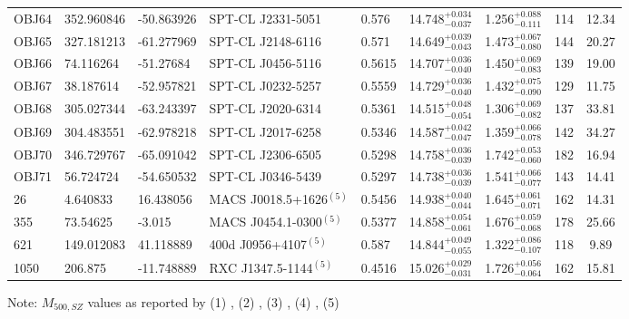 \documentclass[apj,twocolumn]{emulateapj}
\begin{document}
{\begin{table}[h!]
\begin{tabular}{l l l l l c c c c}
 OBJ64 & 352.960846 & -50.863926 &  SPT-CL J2331-5051      & 0.576  & 14.748$^{+0.034}_{-0.037}$ & 1.256$^{+0.088}_{-0.111}$ &   114 & 12.34 \\
 OBJ65 & 327.181213 & -61.277969 &  SPT-CL J2148-6116      & 0.571  & 14.649$^{+0.039}_{-0.043}$ & 1.473$^{+0.067}_{-0.080}$ &   144 & 20.27 \\
 OBJ66 & 74.116264  & -51.27684  &  SPT-CL J0456-5116      & 0.5615 & 14.707$^{+0.036}_{-0.040}$ & 1.450$^{+0.069}_{-0.083}$ &   139 & 19.00 \\
 OBJ67 & 38.187614  & -52.957821 &  SPT-CL J0232-5257      & 0.5559 & 14.729$^{+0.036}_{-0.040}$ & 1.432$^{+0.075}_{-0.090}$ &   129 & 11.75 \\
 OBJ68 & 305.027344 & -63.243397 &  SPT-CL J2020-6314      & 0.5361 & 14.515$^{+0.048}_{-0.054}$ & 1.306$^{+0.069}_{-0.082}$ &   137 & 33.81 \\
 OBJ69 & 304.483551 & -62.978218 &  SPT-CL J2017-6258      & 0.5346 & 14.587$^{+0.042}_{-0.047}$ & 1.359$^{+0.066}_{-0.078}$ &   142 & 34.27 \\
 OBJ70 & 346.729767 & -65.091042 &  SPT-CL J2306-6505      & 0.5298 & 14.758$^{+0.036}_{-0.039}$ & 1.742$^{+0.053}_{-0.060}$ &   182 & 16.94 \\
 OBJ71 & 56.724724  & -54.650532 &  SPT-CL J0346-5439      & 0.5297 & 14.738$^{+0.036}_{-0.039}$ & 1.541$^{+0.066}_{-0.077}$ &   143 & 14.41 \\
 26    & 4.640833   & 16.438056  &  MACS J0018.5+1626$^{(5)}$      & 0.5456 & 14.938$^{+0.040}_{-0.044}$ & 1.645$^{+0.061}_{-0.071}$ &   162 & 14.31 \\
 355   & 73.54625   & -3.015     &  MACS J0454.1-0300$^{(5)}$      & 0.5377 & 14.858$^{+0.054}_{-0.061}$ & 1.676$^{+0.059}_{-0.068}$ &   178 & 25.66 \\
 621   & 149.012083 & 41.118889  &  400d J0956+4107$^{(5)}$        & 0.587  & 14.844$^{+0.049}_{-0.055}$ & 1.322$^{+0.086}_{-0.107}$ &   118 & 9.89  \\
 1050  & 206.875    & -11.748889 &  RXC J1347.5-1144$^{(5)}$       & 0.4516 & 15.026$^{+0.029}_{-0.031}$ & 1.726$^{+0.056}_{-0.064}$ &   162 & 15.81 \\
\hline
\end{tabular}
Note: $M_{500, SZ}$ values as reported by (1) \citet{Brodwin15}, (2) \citet{Brodwin12}, (3) \citet{Mantz14}, (4) \citet{Bleem15}, (5) \citet{Planck15}
\end{table}


\clearpage



}
\end{document}
